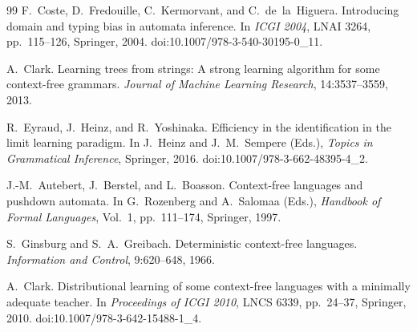 \documentclass[11pt,a4paper]{article}
\theoremstyle{remark}
\theoremstyle{plain}
\begin{document}
\begin{thebibliography}{99}
F.~Coste, D.~Fredouille, C.~Kermorvant, and C.~de~la~Higuera.
\newblock Introducing domain and typing bias in automata inference.
\newblock In \textit{ICGI 2004}, LNAI 3264, pp.~115--126, Springer, 2004.
doi:10.1007/978-3-540-30195-0\_11.

A.~Clark.
\newblock Learning trees from strings: A strong learning algorithm for some context-free grammars.
\newblock \textit{Journal of Machine Learning Research}, 14:3537--3559, 2013.




R.~Eyraud, J.~Heinz, and R.~Yoshinaka.
\newblock Efficiency in the identification in the limit learning paradigm.
\newblock In J.~Heinz and J.~M.~Sempere (Eds.),
\emph{Topics in Grammatical Inference}, Springer, 2016.
doi:10.1007/978-3-662-48395-4\_2.

J.-M.~Autebert, J.~Berstel, and L.~Boasson.
\newblock Context-free languages and pushdown automata.
\newblock In G.~Rozenberg and A.~Salomaa (Eds.),
\emph{Handbook of Formal Languages}, Vol.~1, pp.~111--174,
Springer, 1997.

S.~Ginsburg and S.~A.~Greibach.
\newblock Deterministic context-free languages.
\newblock \emph{Information and Control}, 9:620--648, 1966.

A.~Clark.
\newblock Distributional learning of some context-free languages with a
minimally adequate teacher.
\newblock In \emph{Proceedings of ICGI 2010}, LNCS 6339, pp.~24--37,
Springer, 2010.
doi:10.1007/978-3-642-15488-1\_4.



\end{thebibliography}
\end{document}
